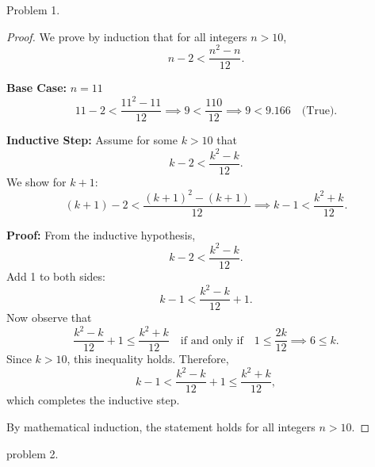 \documentclass{article}
\begin{document}
Problem 1.

\begin{proof}
We prove by induction that for all integers $n > 10$, 
\[
n - 2 < \frac{n^2 - n}{12}.
\]

\textbf{Base Case: } $n = 11$
\[
11 - 2 < \frac{11^2 - 11}{12} \implies 9 < \frac{110}{12} \implies 9 < 9.166\quad \text{(True)}.
\]

\textbf{Inductive Step: } Assume for some $k > 10$ that
\[
k - 2 < \frac{k^2 - k}{12}.
\]
We show for $k + 1$:
\[
(k + 1) - 2 < \frac{(k + 1)^2 - (k + 1)}{12} \implies k - 1 < \frac{k^2 + k}{12}.
\]

\textbf{Proof: } From the inductive hypothesis,
\[
k - 2 < \frac{k^2 - k}{12}.
\]
Add 1 to both sides:
\[
k - 1 < \frac{k^2 - k}{12} + 1.
\]
Now observe that
\[
\frac{k^2 - k}{12} + 1 \leq \frac{k^2 + k}{12} \quad \text{if and only if} \quad 1 \leq \frac{2k}{12} \implies 6 \leq k.
\]
Since $k > 10$, this inequality holds. Therefore,
\[
k - 1 < \frac{k^2 - k}{12} + 1 \leq \frac{k^2 + k}{12},
\]
which completes the inductive step.

By mathematical induction, the statement holds for all integers $n > 10$.

\end{proof}

problem 2.
\end{document}
